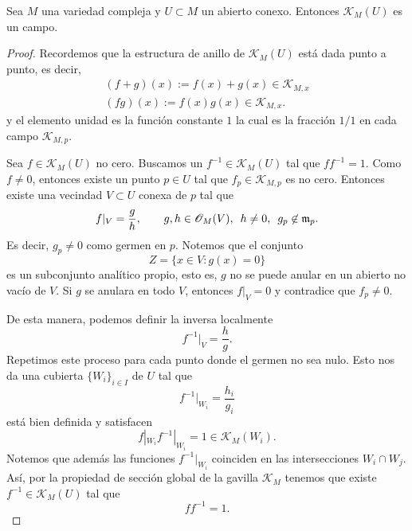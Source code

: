 \begin{propo}\label{campodefunciones}
	Sea $M$ una variedad compleja y $U\subset M$ un abierto conexo. Entonces $\mathcal{K}_{M}(U)$ es un campo.
\end{propo}
\begin{proof}
	Recordemos que la estructura de anillo de $\mathcal{K}_{M}(U)$ está dada punto a punto, es decir,
	\begin{align*}
		(f+g)(x):=f(x)+g(x)\in\mathcal{K}_{M,x}\\
		(fg)(x):=f(x)g(x)\in\mathcal{K}_{M,x}.
	\end{align*}
	y el elemento unidad es la función constante $1$ la cual es la fracción $1/1$ en cada campo $\mathcal{K}_{M,p}$.
	
	Sea $f\in \mathcal{K}_{M}(U)$ no cero. Buscamos un $f^{-1}\in\mathcal{K}_{M}(U)$ tal que $ff^{-1}=1$.
	Como $f\neq 0$, entonces existe un punto $p\in U$ tal que $f_p\in\mathcal{K}_{M,p}$ es no cero. Entonces existe una vecindad $V\subset U$ conexa de $p$ tal que
	\begin{equation*}
		f|_V=\frac gh,\qquad g,h\in\mathscr{O}_M(V),\enspace h\neq 0,\enspace g_p\not\in\mathfrak{m}_p.
	\end{equation*}
	Es decir, $g_p\neq 0$ como germen en $p$. Notemos que el conjunto 
	\begin{equation*}
		Z=\{x\in V:g(x)=0\}
	\end{equation*}
	es un subconjunto analítico propio, esto es, $g$ no se puede anular en un abierto no vacío de $V$. Si $g$ se anulara en todo $V$, entonces $f|_V=0$ y contradice que $f_p\neq 0$.
	
	De esta manera, podemos definir la inversa localmente 
	\begin{equation*}
		f^{-1}|_V=\frac hg.
	\end{equation*} 
	Repetimos este proceso para cada punto donde el germen no sea nulo. Esto nos da una cubierta $\{W_i\}_{i\in I}$ de $U$ tal que
	\begin{equation*}
		f^{-1}|_{W_i}=\frac{h_i}{g_i}
	\end{equation*}
	está bien definida y satisfacen 
	\begin{equation*}
		f|_{W_i}f^{-1}|_{W_i}=1\in\mathcal{K}_M(W_i).
	\end{equation*}
	Notemos que además las funciones $f^{-1}|_{W_i}$ coinciden en las intersecciones $W_i\cap W_j$. Así, por la propiedad de sección global de la gavilla $\mathcal{K}_M$ tenemos que existe $f^{-1}\in \mathcal{K}_{M}(U)$ tal que
	\begin{equation*}
		ff^{-1}=1.
	\end{equation*}
\end{proof}

